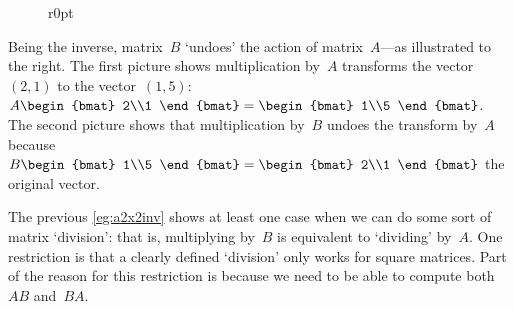 \begin{example}
\begin{solution}
\begin{wrapfigure}r{0pt}
\end{wrapfigure}
Being the inverse, matrix~\(B\) `undoes' the action of matrix~\(A\)---as illustrated to the right.
The first picture shows multiplication by~\(A\) transforms the vector~\((2,1)\) to the vector~\((1,5)\): \(A\begin{bmat} 2\\1 \end{bmat}=\begin{bmat} 1\\5 \end{bmat}\).
The second picture shows that multiplication by~\(B\) undoes the transform by~\(A\) because \(B\begin{bmat} 1\\5 \end{bmat}=\begin{bmat} 2\\1 \end{bmat}\) the original vector.
\aqed

\end{solution}
\end{example}

The previous \cref{eg:a2x2inv} shows at least one case when we can do some sort of matrix `division': that is, multiplying by~\(B\) is equivalent to `dividing' by~\(A\).
One restriction is that a clearly defined `division' only works for square matrices.
Part of the reason for this restriction is because we need to be able to compute both~\(AB\) and~\(BA\).


